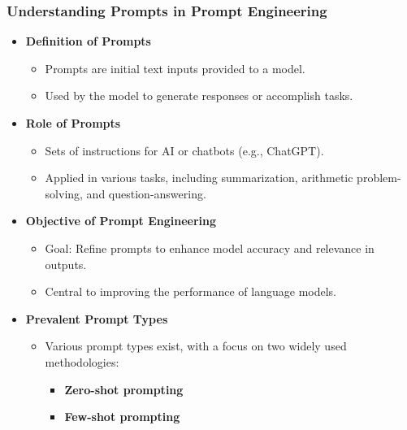 \begin{frame}[fragile]\frametitle{Understanding Prompts in Prompt Engineering}

\begin{itemize}
  \item \textbf{Definition of Prompts}
    \begin{itemize}
      \item Prompts are initial text inputs provided to a model.
      \item Used by the model to generate responses or accomplish tasks.
    \end{itemize}

  \item \textbf{Role of Prompts}
    \begin{itemize}
      \item Sets of instructions for AI or chatbots (e.g., ChatGPT).
      \item Applied in various tasks, including summarization, arithmetic problem-solving, and question-answering.
    \end{itemize}

  \item \textbf{Objective of Prompt Engineering}
    \begin{itemize}
      \item Goal: Refine prompts to enhance model accuracy and relevance in outputs.
      \item Central to improving the performance of language models.
    \end{itemize}

  \item \textbf{Prevalent Prompt Types}
    \begin{itemize}
      \item Various prompt types exist, with a focus on two widely used methodologies:
        \begin{itemize}
          \item \textbf{Zero-shot prompting}
          \item \textbf{Few-shot prompting}
        \end{itemize}
    \end{itemize}
\end{itemize}

\end{frame}

